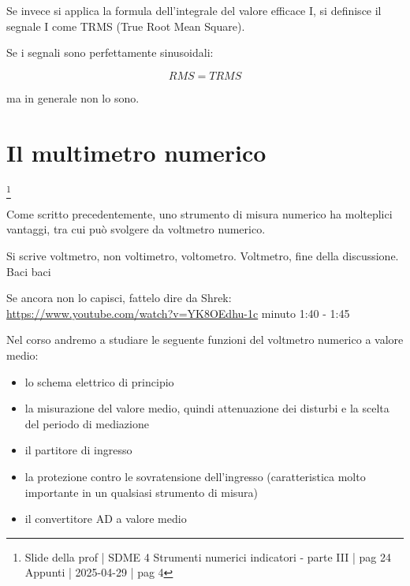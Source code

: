 Se invece si applica la formula dell'integrale del valore efficace I, 
si definisce il segnale I come TRMS (True Root Mean Square). \newline 

Se i segnali sono perfettamente sinusoidali: 

{
    \Large 
    \begin{equation}
        RMS = TRMS
    \end{equation}
}

ma in generale non lo sono. \newline 

\newpage

\section{Il multimetro numerico}
\footnote{Slide della prof | SDME 4 Strumenti numerici indicatori - parte III | pag  24 \\  
Appunti | 2025-04-29 | pag 4} 

Come scritto precedentemente, 
uno strumento di misura numerico ha molteplici vantaggi, tra cui può svolgere da voltmetro numerico. \newline 

\begin{tcolorbox}
    Si scrive voltmetro, non voltimetro, voltometro. \newline 
    Voltmetro, fine della discussione. Baci baci \newline 

    Se ancora non lo capisci, fattelo dire da Shrek: \\
    \url{https://www.youtube.com/watch?v=YK8OEdhu-1c} minuto 1:40 - 1:45
\end{tcolorbox}

Nel corso andremo a studiare le seguente funzioni del voltmetro numerico a valore medio: 

\begin{itemize}
    \item lo schema elettrico di principio 
    \item la misurazione del valore medio, quindi attenuazione dei disturbi e la scelta del periodo di mediazione 
    \item il partitore di ingresso 
    \item la protezione contro le sovratensione dell'ingresso (caratteristica molto importante in un qualsiasi strumento di misura) 
    \item il convertitore AD a valore medio 
\end{itemize}

